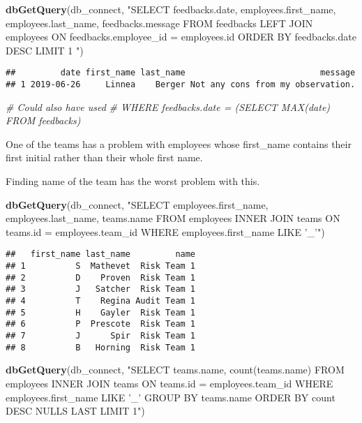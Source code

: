 \documentclass[]{article}
\newenvironment{Shaded}{\begin{snugshade}}{\end{snugshade}}
\newcommand{\CommentTok}[1]{\textcolor[rgb]{0.56,0.35,0.01}{\textit{#1}}}
\newcommand{\KeywordTok}[1]{\textcolor[rgb]{0.13,0.29,0.53}{\textbf{#1}}}
\newcommand{\NormalTok}[1]{#1}
\newcommand{\StringTok}[1]{\textcolor[rgb]{0.31,0.60,0.02}{#1}}
\begin{document}
\begin{Shaded}
\begin{Highlighting}[]
\KeywordTok{dbGetQuery}\NormalTok{(db_connect,}
\StringTok{"SELECT feedbacks.date, employees.first_name, employees.last_name, feedbacks.message}
\StringTok{FROM feedbacks LEFT JOIN employees ON feedbacks.employee_id = employees.id}
\StringTok{   ORDER BY feedbacks.date DESC}
\StringTok{   LIMIT 1}
\StringTok{  "}\NormalTok{)}
\end{Highlighting}
\end{Shaded}

\begin{verbatim}
##         date first_name last_name                           message
## 1 2019-06-26     Linnea    Berger Not any cons from my observation.
\end{verbatim}

\begin{Shaded}
\begin{Highlighting}[]
\CommentTok{# Could also have used}
\CommentTok{# WHERE feedbacks.date = (SELECT MAX(date) FROM feedbacks)}
\end{Highlighting}
\end{Shaded}

One of the teams has a problem with employees whose first\_name contains
their first initial rather than their whole first name.

Finding name of the team has the worst problem with this.

\begin{Shaded}
\begin{Highlighting}[]
\KeywordTok{dbGetQuery}\NormalTok{(db_connect,}
\StringTok{"SELECT employees.first_name, employees.last_name, teams.name}
\StringTok{FROM employees INNER JOIN teams}
\StringTok{ON teams.id = employees.team_id}
\StringTok{WHERE employees.first_name LIKE '_'"}\NormalTok{)}
\end{Highlighting}
\end{Shaded}

\begin{verbatim}
##   first_name last_name         name
## 1          S  Mathevet  Risk Team 1
## 2          D    Proven  Risk Team 1
## 3          J   Satcher  Risk Team 1
## 4          T    Regina Audit Team 1
## 5          H    Gayler  Risk Team 1
## 6          P  Prescote  Risk Team 1
## 7          J      Spir  Risk Team 1
## 8          B   Horning  Risk Team 1
\end{verbatim}

\begin{Shaded}
\begin{Highlighting}[]
\KeywordTok{dbGetQuery}\NormalTok{(db_connect,}
\StringTok{"SELECT teams.name, count(teams.name)}
\StringTok{FROM employees INNER JOIN teams}
\StringTok{ON teams.id = employees.team_id}
\StringTok{WHERE employees.first_name LIKE '_'}
\StringTok{GROUP BY teams.name}
\StringTok{ORDER BY count DESC NULLS LAST}
\StringTok{LIMIT 1"}\NormalTok{)}
\end{Highlighting}
\end{Shaded}
\end{document}
